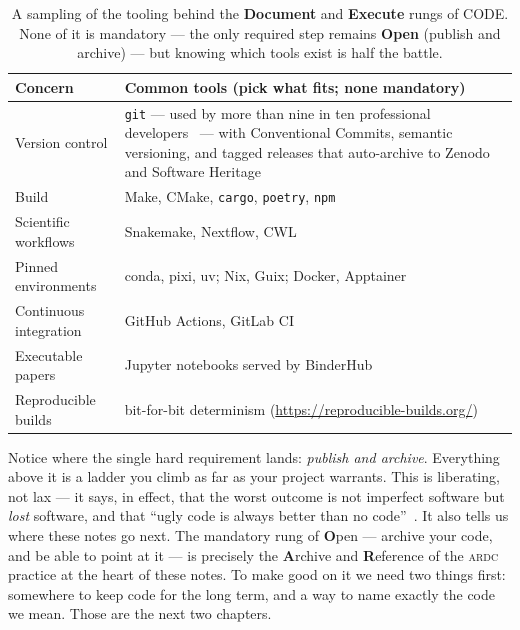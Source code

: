 \begin{table}[htbp]
  \centering\small
  \begin{tabularx}{\linewidth}{@{}>{\raggedright\arraybackslash}p{3.3cm} X@{}}
    \toprule
    \textbf{Concern} & \textbf{Common tools (pick what fits; none mandatory)} \\
    \midrule
    Version control & \texttt{git} --- used by more than nine in ten professional
      developers~\autocite{stackoverflow2022} --- with Conventional Commits, semantic versioning, and
      tagged releases that auto-archive to Zenodo and Software Heritage \\
    Build & Make, CMake, \texttt{cargo}, \texttt{poetry}, \texttt{npm} \\
    Scientific workflows & Snakemake, Nextflow, CWL \\
    Pinned environments & conda, pixi, uv; Nix, Guix; Docker, Apptainer \\
    Continuous integration & GitHub Actions, GitLab CI \\
    Executable papers & Jupyter notebooks served by BinderHub \\
    Reproducible builds & bit-for-bit determinism (\url{https://reproducible-builds.org/}) \\
    \bottomrule
  \end{tabularx}
  \caption[A toolbox for the CODE rungs]{A sampling of the tooling behind the \textbf{Document} and
  \textbf{Execute} rungs of CODE. None of it is mandatory --- the only required step remains
  \textbf{Open} (publish and archive) --- but knowing which tools exist is half the battle.}
  \label{tab:toolbox}
\end{table}

Notice where the single hard requirement lands: \emph{publish and archive}. Everything above it is
a ladder you climb as far as your project warrants. This is liberating, not lax --- it says, in
effect, that the worst outcome is not imperfect software but \emph{lost} software, and that
\enquote{ugly code is always better than no code}~\autocite{Leveque2013}. It also tells us where
these notes go next. The mandatory rung of \textbf{O}pen --- archive your code, and be able to
point at it --- is precisely the \textbf{A}rchive and \textbf{R}eference of the \textsc{ardc} practice at
the heart of these notes. To make good on it we need two things first: somewhere to keep code for
the long term, and a way to name exactly the code we mean. Those are the next two chapters.
